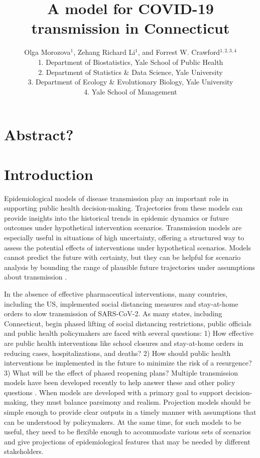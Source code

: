 \documentclass[11pt]{article}
\title{A model for COVID-19 transmission in Connecticut}
\author{Olga Morozova$^{1}$,
  Zehang Richard Li$^1$,
and Forrest W. Crawford$^{1,2,3,4}$  \\[1em]
\small 1. Department of Biostatistics, Yale School of Public Health \\
\small 2. Department of Statistics \& Data Science, Yale University \\
\small 3. Department of Ecology \& Evolutionary Biology, Yale University \\
\small 4. Yale School of Management }
\begin{document}
\maketitle


\section{Abstract?}



\section{Introduction}


Epidemiological models of disease transmission play an important role in supporting public health decision-making. Trajectories from these models can provide insights into the historical trends in epidemic dynamics or future outcomes under hypothetical intervention scenarios. 
Transmission models are especially useful in situations of high uncertainty, offering a structured way to assess the potential effects of interventions under hypothetical scenarios.  Models cannot predict the future with certainty, but they can be helpful for scenario analysis by bounding the range of plausible future trajectories under assumptions about transmission \citep{holmdahl2020wrong}. 

In the absence of effective pharmaceutical interventions, many countries, including the US, implemented social distancing measures and stay-at-home orders to slow transmission of SARS-CoV-2. 
As many states, including Connecticut, begin phased lifting of social distancing restrictions, public officials and public health policymakers are faced with several questions: 1) How effective are public health interventions like school closures and stay-at-home orders in reducing cases, hospitalizations, and deaths? 2)  How should public health interventions be implemented in the future to minimize the risk of a resurgence? 3) What will be the effect of phased reopening plans?  
Multiple transmission models have been developed recently to help answer these and other policy questions \citep{cdc2020covid19forecasts, kissler2020projecting, ferguson2020impact, unwin2020state, brett2020covid, miller2020mobility, aleta2020modeling, childs2020impact, yamana2020projection, zou2020epidemic, tian2020evaluate, perez2020importance, salje2020estimating, didomenico2020expected, dehning2020inferring, ferretti2020quantifying, prem2020effect, chinazzi2020effect, kucharski2020early, leung2020first, britton2020disease, gomes2020individual}. 
When models are developed with a primary goal to support decision-making, they must balance parsimony and realism. Projection models should be simple enough to provide clear outputs in a timely manner with assumptions that can be understood by policymakers. At the same time, for such models to be useful, they need to be flexible enough to accommodate various sets of scenarios and give projections of epidemiological features that may be needed by different stakeholders. 
\end{document}
